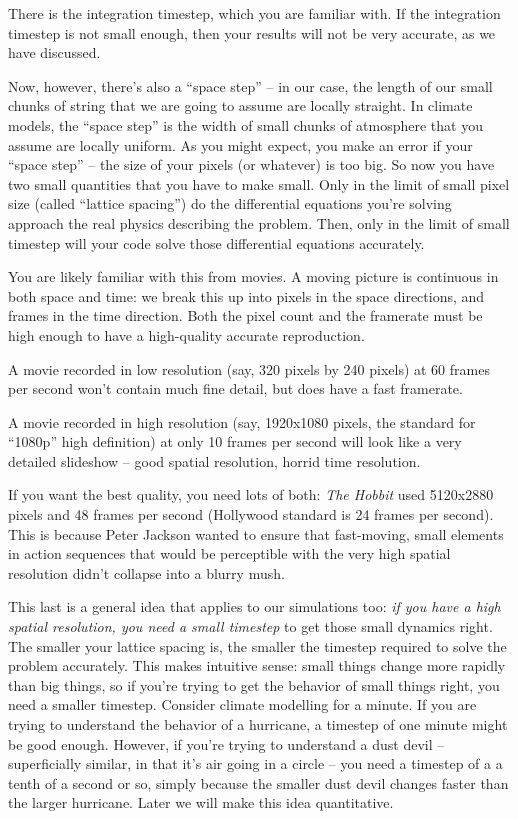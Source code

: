 \documentclass[12ampt]{article}
\begin{document}
There is the integration timestep, which you are familiar with. 
If the integration timestep is not small enough, then your results will not be very
accurate, as we have discussed. 

Now, however, there’s also a ``space step'' -- in our case,
the length of our small chunks of string that we are going to assume are locally straight.
In climate models, the ``space step'' is the width of small chunks of atmosphere that you
assume are locally uniform. As you might expect, you make an error if your ``space step'' --
the size of your pixels (or whatever) is too big. So now you have two small quantities that
you have to make small. Only in the limit of small pixel size (called ``lattice spacing'') do
the differential equations you’re solving approach the real physics describing the
problem.  Then, only in the limit of small timestep will your code solve those differential
equations accurately. 

You are likely familiar with this from movies. A moving picture is continuous in both space and time:
we break this up into pixels in the space directions, and frames in the time direction. Both the pixel count
and the framerate must be high enough to have a high-quality accurate reproduction. 

A movie recorded in low resolution (say, 320 pixels by 240 pixels) at 60 frames per second 
won't contain much fine detail, but does have a fast framerate.

A movie recorded in high resolution (say, 1920x1080 pixels, the standard for ``1080p'' high definition) at only 10 frames per second
will look like a very detailed slideshow -- good spatial resolution, horrid time resolution.

If you want the best quality, you need lots of both: {\it The Hobbit} used 5120x2880 pixels and 48 frames per second (Hollywood standard is 24 frames per second).
This is because Peter Jackson wanted to ensure that fast-moving, small elements in action sequences that would be perceptible with the very high spatial resolution
didn't collapse into a blurry mush. 

This last is a general idea that applies to our simulations too: {\it if you have a high spatial resolution, you need a small timestep} to get those small dynamics right.
The smaller your lattice spacing is, the smaller the timestep required to
solve the problem accurately. This makes intuitive sense: small things change more rapidly
than big things, so if you’re trying to get the behavior of small things right, you need a
smaller timestep. Consider climate modelling for a minute. If you are trying to understand
the behavior of a hurricane, a timestep of one minute might be good enough. However, if
you’re trying to understand a dust devil – superficially similar, in that it’s air going in a
circle – you need a timestep of a a tenth of a second or so, simply because the smaller dust
devil changes faster than the larger hurricane. Later we will make this idea quantitative.
\end{document}
